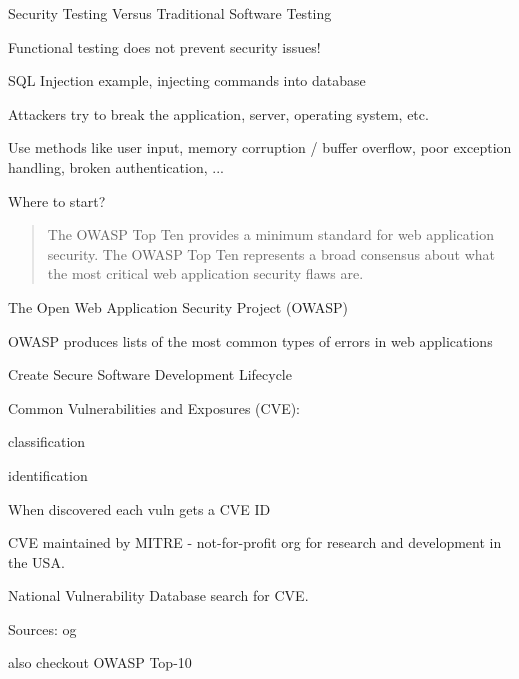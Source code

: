 \documentclass[Screen16to9,17pt]{foils}
\begin{document}

\begin{list2}
\item Security Testing Versus Traditional Software Testing
\item Functional testing does not prevent security issues!
\item SQL Injection example, injecting commands into database
\item Attackers try to break the application, server, operating system, etc.
\item Use methods like user input, memory corruption / buffer overflow, poor exception handling, broken authentication, ...
\end{list2}

\vskip 2cm
\centerline{\LARGE Where to start?}



\begin{quote}
The OWASP Top Ten provides a minimum standard for web application
security. The OWASP Top Ten represents a broad consensus about what
the most critical web application security flaws are.
\end{quote}

\begin{list1}
\item The Open Web Application Security Project (OWASP)
\item OWASP produces lists of the most common types of errors in web applications
\item {}
\item Create Secure Software Development Lifecycle
\end{list1}




\begin{list1}
\item Common Vulnerabilities and Exposures (CVE):
  \begin{list2}
  \item classification
  \item identification
  \end{list2}
\item When discovered each vuln gets a CVE ID
\item CVE maintained by MITRE - not-for-profit
org for research and development in the USA.
\item National Vulnerability Database search for CVE.
\item Sources:  og 
\item also checkout OWASP Top-10 
\end{list1}
\end{document}
